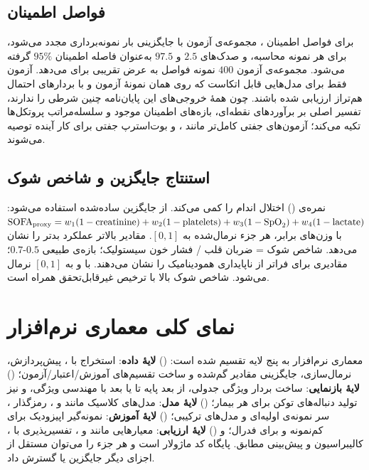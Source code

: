\subsection{فواصل اطمینان }

برای فواصل اطمینان ، مجموعه‌ی آزمون با جایگزینی  بار نمونه‌برداری مجدد می‌شود،  برای هر نمونه محاسبه، و صدک‌های $2.5$ و $97.5$ به‌عنوان فاصله اطمینان $95\%$ گرفته می‌شود. مجموعه‌ی آزمون $400$ نمونه فواصل به عرض تقریبی \mbox{} برای  می‌دهد. آزمون  فقط برای مدل‌هایی قابل اتکاست که روی همان نمونۀ آزمون و با بردارهای احتمال هم‌تراز ارزیابی شده باشند. چون همۀ خروجی‌های این پایان‌نامه چنین شرطی را ندارند، تفسیر اصلی بر برآوردهای نقطه‌ای، بازه‌های اطمینان موجود و سلسله‌مراتب پروتکل‌ها تکیه می‌کند؛ آزمون‌های جفتی کامل‌تر مانند ،  و بوت‌استرپ جفتی برای کار آینده توصیه می‌شوند.

\subsection{استنتاج جایگزین  و شاخص شوک}

نمره‌ی  () اختلال اندام را کمی می‌کند. از جایگزین ساده‌شده استفاده می‌شود: $\text{SOFA}_{\text{proxy}} = w_1(1 - \text{creatinine}) + w_2(1 - \text{platelets}) + w_3(1 - \text{SpO}_2) + w_4(1 - \text{lactate})$ با وزن‌های برابر، هر جزء نرمال‌شده به $[0,1]$. مقادیر بالاتر عملکرد بدتر را نشان می‌دهد. شاخص شوک = ضربان قلب / فشار خون سیستولیک؛ بازه‌ی طبیعی $0.5$-$0.7$؛ مقادیری برای \mbox{} فراتر از \mbox{} ناپایداری همودینامیک را نشان می‌دهند. با  و  به $[0,1]$ نرمال می‌شود. شاخص شوک بالا با ترخیص غیرقابل‌تحقق همراه است.

\section{نمای کلی معماری نرم‌افزار}

معماری نرم‌افزار به پنج لایه تقسیم شده است: () \textbf{لایۀ داده}: استخراج  با ، پیش‌پردازش، نرمال‌سازی، جایگزینی مقادیر گم‌شده و ساخت تقسیم‌های آموزش/اعتبار/آزمون؛ () \textbf{لایۀ بازنمایی}: ساخت بردار ویژگی جدولی، از  بعد پایه تا  یا  بعد با مهندسی ویژگی، و نیز تولید دنباله‌های توکن برای هر بیمار؛ () \textbf{لایۀ مدل}: مدل‌های کلاسیک مانند  و ، رمزگذار ، سر نمونه‌ی اولیه‌ای و مدل‌های ترکیبی؛ () \textbf{لایۀ آموزش}: نمونه‌گیر اپیزودیک برای کم‌نمونه و  برای فدرال؛ و () \textbf{لایۀ ارزیابی}: معیارهایی مانند  و ، تفسیرپذیری با ، کالیبراسیون و پیش‌بینی مطابق. پایگاه کد ماژولار است و هر جزء را می‌توان مستقل از اجزای دیگر جایگزین یا گسترش داد.

